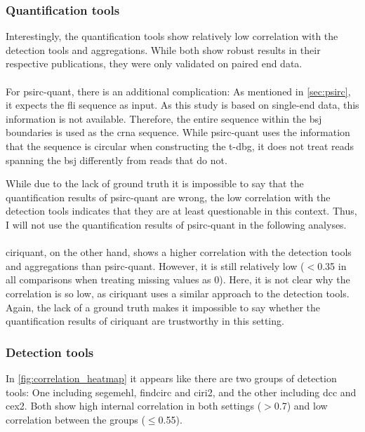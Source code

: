 \subsubsection{Quantification tools}
Interestingly, the quantification tools show relatively low correlation with
the detection tools and aggregations.
While both show robust results in their respective publications, they were only
validated on paired end
data\supercite{zhang_accurate_2020,yu_quantifying_2021}.

\paragraph{}
For \gls{psirc-quant}, there is an additional complication: As mentioned in
\cref{sec:psirc}, it expects the \gls{fli} sequence as input.
As this study is based on single-end data, this information is not available.
Therefore, the entire sequence within the \gls{bsj} boundaries is used as the
\gls{crna} sequence.
While \gls{psirc-quant} uses the information that the sequence is circular when
constructing the \gls{t-dbg}, it does not treat reads spanning the \gls{bsj}
differently from reads that do not\supercite{yu_quantifying_2021}.

While due to the lack of ground truth it is impossible to say that the
quantification results of \gls{psirc-quant} are wrong, the low correlation with
the detection tools indicates that they are at least questionable in this
context.
Thus, I will not use the quantification results of \gls{psirc-quant} in the
following analyses.

\paragraph{}
\Gls{ciriquant}, on the other hand, shows a higher correlation with
the detection tools and aggregations than \gls{psirc-quant}.
However, it is still relatively low ($<$0.35 in all comparisons when treating
missing values as 0).
Here, it is not clear why the correlation is so low, as \gls{ciriquant} uses a
similar approach to the detection tools.
Again, the lack of a ground truth makes it impossible to say whether the
quantification results of \gls{ciriquant} are trustworthy in this setting.

\subsubsection{Detection tools}
In \cref{fig:correlation_heatmap} it appears like there are two groups of
detection tools: One including \gls{segemehl}, \gls{findcirc} and \gls{ciri2},
and the other including \gls{dcc} and \gls{cex2}.
Both show high internal correlation in both settings ($>$0.7) and low
correlation between the groups ($\leq$0.55).

